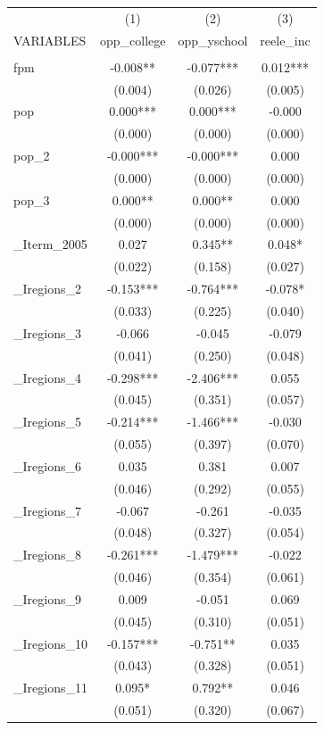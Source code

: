 \documentclass[]{article}
\begin{document}
\begin{tabular}{lccc} \hline
 & (1) & (2) & (3) \\
VARIABLES & opp\_college & opp\_yschool & reele\_inc \\ \hline
 &  &  &  \\
fpm & -0.008** & -0.077*** & 0.012*** \\
 & (0.004) & (0.026) & (0.005) \\
pop & 0.000*** & 0.000*** & -0.000 \\
 & (0.000) & (0.000) & (0.000) \\
pop\_2 & -0.000*** & -0.000*** & 0.000 \\
 & (0.000) & (0.000) & (0.000) \\
pop\_3 & 0.000** & 0.000** & 0.000 \\
 & (0.000) & (0.000) & (0.000) \\
\_Iterm\_2005 & 0.027 & 0.345** & 0.048* \\
 & (0.022) & (0.158) & (0.027) \\
\_Iregions\_2 & -0.153*** & -0.764*** & -0.078* \\
 & (0.033) & (0.225) & (0.040) \\
\_Iregions\_3 & -0.066 & -0.045 & -0.079 \\
 & (0.041) & (0.250) & (0.048) \\
\_Iregions\_4 & -0.298*** & -2.406*** & 0.055 \\
 & (0.045) & (0.351) & (0.057) \\
\_Iregions\_5 & -0.214*** & -1.466*** & -0.030 \\
 & (0.055) & (0.397) & (0.070) \\
\_Iregions\_6 & 0.035 & 0.381 & 0.007 \\
 & (0.046) & (0.292) & (0.055) \\
\_Iregions\_7 & -0.067 & -0.261 & -0.035 \\
 & (0.048) & (0.327) & (0.054) \\
\_Iregions\_8 & -0.261*** & -1.479*** & -0.022 \\
 & (0.046) & (0.354) & (0.061) \\
\_Iregions\_9 & 0.009 & -0.051 & 0.069 \\
 & (0.045) & (0.310) & (0.051) \\
\_Iregions\_10 & -0.157*** & -0.751** & 0.035 \\
 & (0.043) & (0.328) & (0.051) \\
\_Iregions\_11 & 0.095* & 0.792** & 0.046 \\
 & (0.051) & (0.320) & (0.067) \\

\end{tabular}
\end{document}
